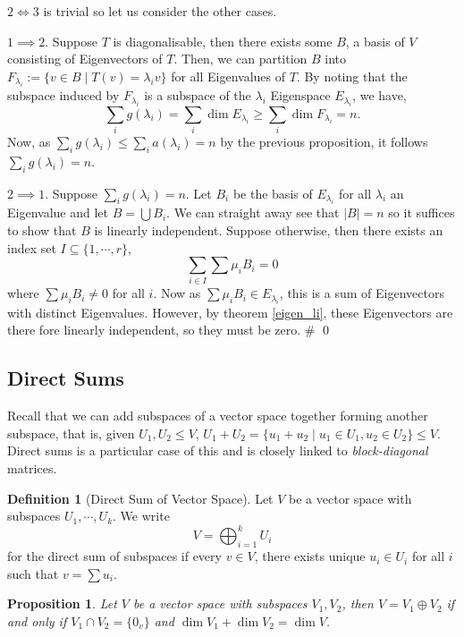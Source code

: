 \documentclass[
]{article}
\newtheorem{prop}{Proposition}[section]
\theoremstyle{definition}
\newtheorem{definition}{Definition}[section]
\begin{document}
\(2 \iff 3\) is trivial so let us consider the other cases.

\(1 \implies 2\). Suppose \(T\) is diagonalisable, then there exists
some \(B\), a basis of \(V\) consisting of Eigenvectors of \(T\). Then,
we can partition \(B\) into
\(F_{\lambda_i} := \{v \in B \mid T(v) = \lambda_i v\}\) for all
Eigenvalues of \(T\). By noting that the subspace induced by
\(F_{\lambda_i}\) is a subspace of the \(\lambda_i\) Eigenspace
\(E_{\lambda_i}\), we have,
\[\sum_i g(\lambda_i) = \sum_i \dim E_{\lambda_i} \ge \sum_i \dim F_{\lambda_i} = n.\]
Now, as \(\sum_i g(\lambda_i) \le \sum_i a(\lambda_i) = n\) by the
previous proposition, it follows \(\sum_i g(\lambda_i) = n\).

\(2 \implies 1\). Suppose \(\sum_i g(\lambda_i) = n\). Let \(B_i\) be
the basis of \(E_{\lambda_i}\) for all \(\lambda_i\) an Eigenvalue and
let \(B = \bigcup B_i\). We can straight away see that
\(\left| B \right| = n\) so it suffices to show that \(B\) is linearly
independent. Suppose otherwise, then there exists an index set
\(I \subseteq \{1, \cdots, r\}\), \[\sum_{i \in I} \sum \mu_i B_i = 0\]
where \(\sum \mu_i B_i \neq 0\) for all \(i\). Now as
\(\sum \mu_i B_i \in E_{\lambda_i}\), this is a sum of Eigenvectors with
distinct Eigenvalues. However, by theorem \ref{eigen_li}, these
Eigenvectors are there fore linearly independent, so they must be zero.
\# \qed

\hypertarget{direct-sums}{%
\subsection{Direct Sums}\label{direct-sums}}

Recall that we can add subspaces of a vector space together forming
another subspace, that is, given \(U_1, U_2 \le V\),
\(U_1 + U_2 = \{u_1 + u_2 \mid u_1 \in U_1, u_2 \in U_2\} \le V\).
Direct sums is a particular case of this and is closely linked to
\emph{block-diagonal} matrices.

\begin{definition}[Direct Sum of Vector Space]
  Let \(V\) be a vector space with subspaces \(U_1, \cdots, U_k\). We write 
  \[V = \bigoplus_{i = 1}^k U_i\]
  for the direct sum of subspaces if every \(v \in V\), there exists unique 
  \(u_i \in U_i\) for all \(i\) such that \(v = \sum u_i\).
\end{definition}

\begin{prop}
  Let \(V\) be a vector space with subspaces \(V_1, V_2\), then 
  \(V = V_1 \oplus V_2\) if and only if \(V_1 \cap V_2 = \{0_v\}\) and 
  \(\dim V_1 + \dim V_2 = \dim V\).
\end{prop}
\proof
\end{document}
